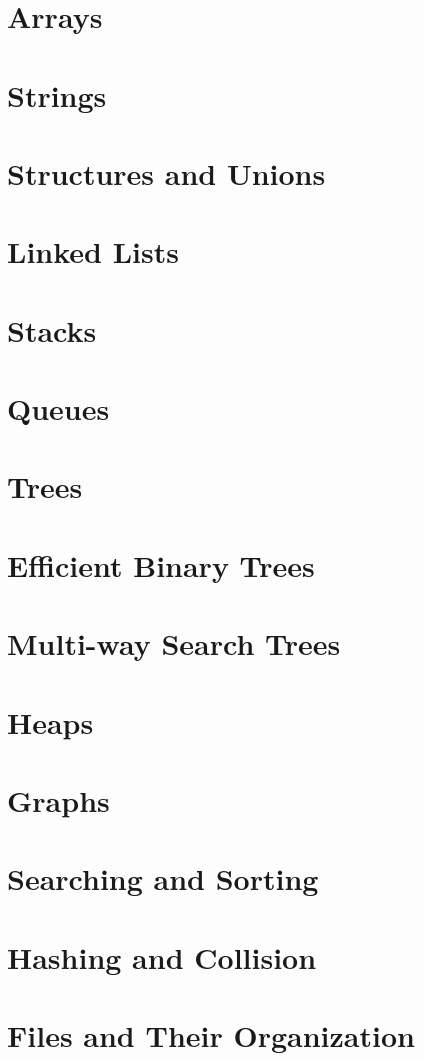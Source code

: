 \documentclass[fontsize=12pt,paper=a4]{book}
\begin{document}
\chapter{Arrays}

\chapter{Strings}

\chapter{Structures and Unions}

\chapter{Linked Lists}

\chapter{Stacks}

\chapter{Queues}

\chapter{Trees}

\chapter{Efficient Binary Trees}

\chapter{Multi-way Search Trees}

\chapter{Heaps}

\chapter{Graphs}

\chapter{Searching and Sorting}

\chapter{Hashing and Collision}

\chapter{Files and Their Organization}
\end{document}
